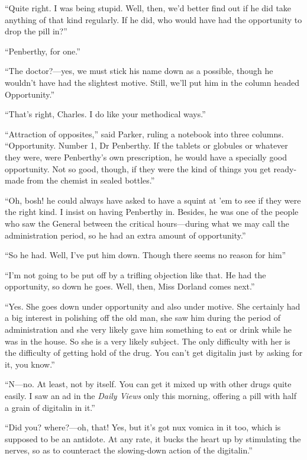 \enquote{Quite right. I was being stupid. Well, then, we'd better find out if he did take anything of that kind regularly. If he did, who would have had the opportunity to drop the pill in?}

\enquote{Penberthy, for one.}

\enquote{The doctor?---yes, we must stick his name down as a possible, though he wouldn't have had the slightest motive. Still, we'll put him in the column headed Opportunity.}

\enquote{That's right, Charles. I do like your methodical ways.}

\enquote{Attraction of opposites,} said Parker, ruling a notebook into three columns. \enquote{Opportunity. Number 1, Dr Penberthy. If the tablets or globules or whatever they were, were Penberthy's own prescription, he would have a specially good opportunity. Not so good, though, if they were the kind of things you get ready-made from the chemist in sealed bottles.}

\enquote{Oh, bosh! he could always have asked to have a squint at 'em to see if they were the right kind. I insist on having Penberthy in. Besides, he was one of the people who saw the General between the critical hours\allowbreak---\allowbreak during what we may call the administration period, so he had an extra amount of opportunity.}

\enquote{So he had. Well, I've put him down. Though there seems no reason for him\longdash}

\enquote{I'm not going to be put off by a trifling objection like that. He had the opportunity, so down he goes. Well, then, Miss Dorland comes next.}

\enquote{Yes. She goes down under opportunity and also under motive. She certainly had a big interest in polishing off the old man, she saw him during the period of administration and she very likely gave him something to eat or drink while he was in the house. So she is a very likely subject. The only difficulty with her is the difficulty of getting hold of the drug. You can't get digitalin just by asking for it, you know.}

\enquote{N\allowbreak---\allowbreak no. At least, not by itself. You can get it mixed up with other drugs quite easily. I saw an ad in the \textit{Daily Views} only this morning, offering a pill with half a grain of digitalin in it.}

\enquote{Did you? where?---oh, that! Yes, but it's got nux vomica in it too, which is supposed to be an antidote. At any rate, it bucks the heart up by stimulating the nerves, so as to counteract the slowing-down action of the digitalin.}

